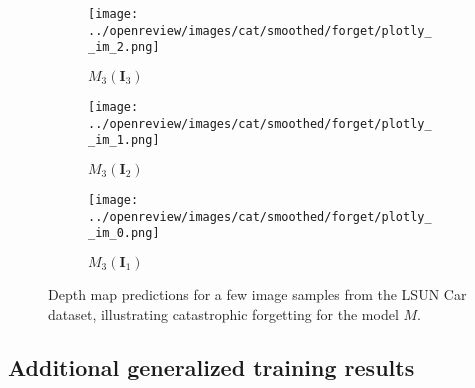 \begin{figure}[!htb]
\begin{subfigure}{0.33\textwidth}
    \centering
    \texttt{[image: ../openreview/images/cat/smoothed/forget/plotly\_\_im\_2.png]}
    \caption{$M_{3}(\textbf{I}_{3})$}
    
\end{subfigure}
\begin{subfigure}{0.33\textwidth}
    \centering
    \texttt{[image: ../openreview/images/cat/smoothed/forget/plotly\_\_im\_1.png]}
    \caption{$M_{3}(\textbf{I}_2)$}
    
\end{subfigure}
\begin{subfigure}{0.33\textwidth}
    \centering
    \texttt{[image: ../openreview/images/cat/smoothed/forget/plotly\_\_im\_0.png]}
    \caption{$M_{3}(\textbf{I}_1)$}
    
\end{subfigure}
    \caption{Depth map predictions for a few image samples from the LSUN Car dataset, illustrating catastrophic forgetting for the model $M$. }
    \label{fig:forget_cat}
\end{figure}

\newpage

\subsection{Additional generalized training results}

